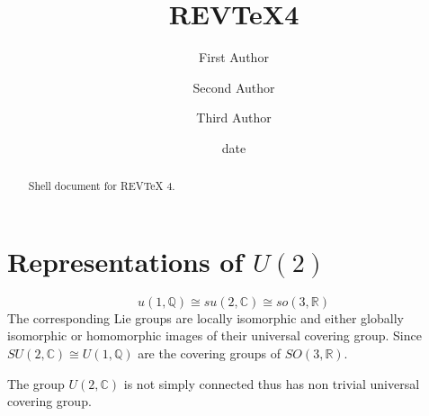 \documentclass[aps,preprint]{revtex4}%
\begin{document}
\title[Short title for running header]{REV\TeX4}
\author{First Author}
\author{Second Author}
\author{Third Author}

\begin{abstract}
Shell document for REV\TeX{} 4.

\end{abstract}
\date[Date text]{date}




\maketitle
\tableofcontents


\section{Representations of $U(2)$}%

\begin{equation}
u\left(  1,\mathbb{Q}\right)  \cong su\left(  2,\mathbb{C}\right)  \cong
so\left(  3,\mathbb{R}\right)
\end{equation}
The corresponding Lie groups are locally isomorphic and either globally
isomorphic or homomorphic images of their universal covering group. Since
$SU\left(  2,\mathbb{C}\right)  \cong U\left(  1,\mathbb{Q}\right)  $ are the
covering groups of $SO\left(  3,\mathbb{R}\right)  .$ 

The group $U\left(  2,\mathbb{C}\right)  $ is not simply connected thus has
non trivial universal covering group.
\end{document}

